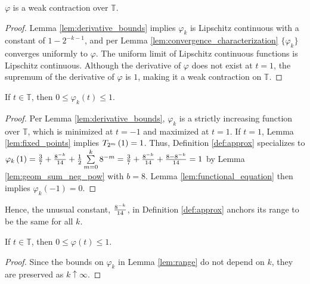 \begin{lemma}
  \label{lem:contraction}
  $\varphi$ is a weak contraction over $\mathbb{T}$.
\end{lemma}

\begin{proof}
  Lemma \ref{lem:derivative_bounds} implies $\varphi_k$ is Lipschitz continuous with a constant of $1 - 2^{-k - 1}$, and per Lemma \ref{lem:convergence_characterization} $\{\varphi_k\}$ converges uniformly to $\varphi$. The uniform limit of Lipschitz continuous functions is Lipschitz continuous. Although the derivative of $\varphi$ does not exist at $t = 1$, the supremum of the derivative of $\varphi$ is $1$, making it a weak contraction on $\mathbb{T}$.
\end{proof}

\begin{lemma}
  \label{lem:range}
  If $t \in \mathbb{T}$, then $0 \leq \varphi_k\left(t\right) \leq 1$.
\end{lemma}

\begin{proof}
  Per Lemma \ref{lem:derivative_bounds}, $\varphi_k$ is a strictly increasing function over $\mathbb{T}$, which is minimized at $t = -1$ and maximized at $t = 1$.
  If $t = 1$, Lemma \ref{lem:fixed_points} implies $\TT[1]{m} = 1$. Thus, Definition \ref{def:approx} specializes to $\varphi_k\left(1\right) = \frac{3}{7} + \frac{8^{-k}}{14} + \frac{1}{2} \sum\limits_{m = 0}^k 8^{-m} = \frac{3}{7} + \frac{8^{-k}}{14} + \frac{8 - 8^{-k}}{14} = 1$ by Lemma \ref{lem:geom_sum_neg_pow} with $b = 8$. Lemma \ref{lem:functional_equation} then implies $\varphi_k\left(-1\right) = 0$.
\end{proof}
\noindent Hence, the unusual constant, $\frac{8^{-k}}{14}$, in Definition \ref{def:approx} anchors its range to be the same for all $k$.

\begin{lemma}
  \label{lem:range_limit}
  If $t \in \mathbb{T}$, then $0 \leq \varphi\left(t\right) \leq 1$.
\end{lemma}
\begin{proof}
    Since the bounds on $\varphi_k$ in Lemma \ref{lem:range} do not depend on $k$, they are preserved as $k \uparrow \infty$.
\end{proof}

